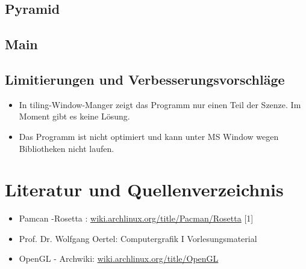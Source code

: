 \documentclass[12pt]{article}
\begin{document}
\subsection{Pyramid}


\subsection{Main}


\subsection{Limitierungen und Verbesserungsvorschläge}
\begin{itemize}
	\item In tiling-Window-Manger zeigt das Programm nur einen Teil der Szenze. Im Moment gibt es keine Lösung.
	\item Das Programm ist nicht optimiert und kann unter MS Window wegen Bibliotheken nicht laufen.
\end{itemize}

\section{Literatur und Quellenverzeichnis}
\begin{itemize}
	\item Pamcan -Rosetta : \url{wiki.archlinux.org/title/Pacman/Rosetta} \label{sec:pacman} [1]
	\item Prof. Dr. Wolfgang Oertel: Computergrafik I Vorlesungsmaterial
	\item OpenGL - Archwiki: \url{wiki.archlinux.org/title/OpenGL}
\end{itemize}
\end{document}
